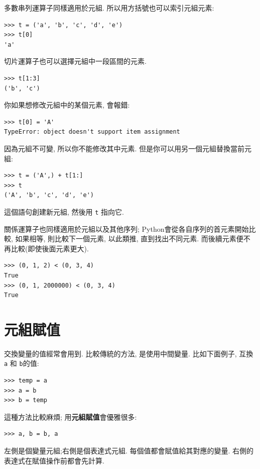\documentclass[10pt]{book}
\begin{document}
多數串列運算子同樣適用於元組. 
所以用方括號也可以索引元組元素:

\begin{verbatim}
>>> t = ('a', 'b', 'c', 'd', 'e')
>>> t[0]
'a'
\end{verbatim}
%
切片運算子也可以選擇元組中一段區間的元素. 

\begin{verbatim}
>>> t[1:3]
('b', 'c')
\end{verbatim}
%
你如果想修改元組中的某個元素, 會報錯:

\begin{verbatim}
>>> t[0] = 'A'
TypeError: object doesn't support item assignment
\end{verbatim}
%
因為元組不可變, 所以你不能修改其中元素. 
但是你可以用另一個元組替換當前元組:

\begin{verbatim}
>>> t = ('A',) + t[1:]
>>> t
('A', 'b', 'c', 'd', 'e')
\end{verbatim}
%
這個語句創建新元組, 然後用 {\tt t} 指向它. 

關係運算子也同樣適用於元組以及其他序列;
Python會從各自序列的首元素開始比較, 如果相等, 則比較下一個元素, 
以此類推, 直到找出不同元素. 
而後續元素便不再比較(即使後面元素更大). 

\begin{verbatim}
>>> (0, 1, 2) < (0, 3, 4)
True
>>> (0, 1, 2000000) < (0, 3, 4)
True
\end{verbatim}



\section{元組賦值}
\label{tuple.assignment}
交換變量的值經常會用到. 
比較傳統的方法, 是使用中間變量. 
比如下面例子, 互換 {\tt a} 和 {\tt b}的值:

\begin{verbatim}
>>> temp = a
>>> a = b
>>> b = temp
\end{verbatim}
%
這種方法比較麻煩; 用{\bf 元組賦值}會優雅很多:

\begin{verbatim}
>>> a, b = b, a
\end{verbatim}
%
左側是個變量元組;右側是個表達式元組. 
每個值都會賦值給其對應的變量. 
右側的表達式在賦值操作前都會先計算. 
\end{document}
